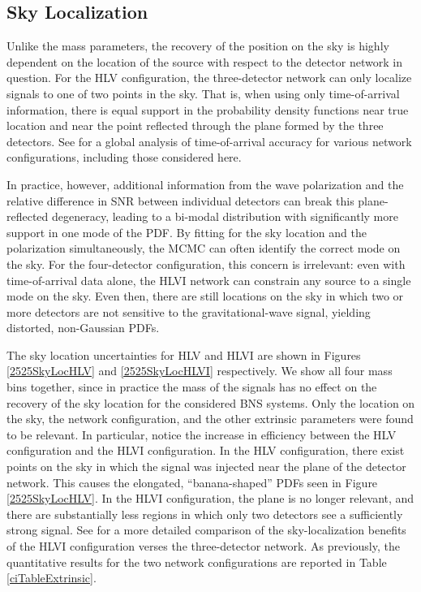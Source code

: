 \documentclass[11pt,a4paper]{emulateapj} 
\begin{document}
\subsection{Sky Localization}
\label{skySection}
 
Unlike the mass parameters, the recovery of the position on the sky is
highly dependent on the location of the source with respect to the
detector network in question.  For the HLV configuration, the
three-detector network can only localize signals to one of two points
in the sky.  That is, when using only time-of-arrival information,
there is equal support in the probability density functions near true
location and near the point reflected through the plane formed by the
three detectors.  See \cite{Fairhurst2011} for a global analysis of
time-of-arrival accuracy for various network configurations, including
those considered here.
  
  
  In practice, however, additional information from the wave
  polarization and the relative difference in SNR between individual
  detectors can break this plane-reflected degeneracy, leading to a
  bi-modal distribution with significantly more support in one mode of
  the PDF.  By fitting for the sky location and the polarization
  simultaneously, the MCMC can often identify the correct mode on the
  sky.  For the four-detector configuration, this concern is
  irrelevant: even with time-of-arrival data alone, the HLVI network
  can constrain any source to a single mode on the sky.  Even then,
  there are still locations on the sky in which two or more detectors
  are not sensitive to the gravitational-wave signal, yielding
  distorted, non-Gaussian PDFs.

The sky location uncertainties for HLV and HLVI are shown in Figures
\ref{2525SkyLocHLV} and \ref{2525SkyLocHLVI} respectively.  We show
all four mass bins together, since in practice the mass of the signals
has no effect on the recovery of the sky location for the considered
BNS systems.  Only the location on the sky, the network configuration,
and the other extrinsic parameters were found to be relevant.  In
particular, notice the increase in efficiency between the HLV
configuration and the HLVI configuration.  In the HLV configuration,
there exist points on the sky in which the signal was injected near
the plane of the detector network.  This causes the elongated,
``banana-shaped'' PDFs seen in Figure \ref{2525SkyLocHLV}.  In the
HLVI configuration, the plane is no longer relevant, and there are
substantially less regions in which only two detectors see a
sufficiently strong signal.  See \cite{Veitch2012} for a more detailed
comparison of the sky-localization benefits of the HLVI configuration
verses the three-detector network.  As previously, the quantitative
results for the two network configurations are reported in Table
\ref{ciTableExtrinsic}.
\end{document}
